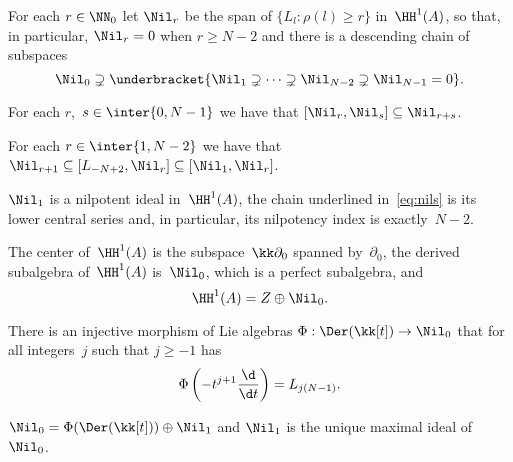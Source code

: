 \begin{Proposition}\label{prop:nil}
For each $r\in\NN_0$ let $\Nil_r$ be the span of $\{L_l:\rho(l)\geq r\}$
in~$\HH^1(A)$, so that, in particular, $\Nil_r=0$ when $r\geq N-2$ and
there is a descending chain of subspaces
  \[ \label{eq:nils}
        \Nil_0 \supsetneq 
          \underbracket{
              \Nil_1
              \supsetneq \cdots
              \supsetneq \Nil_{N-2}
              \supsetneq \Nil_{N-1} = 0
              }
        .
  \]
\begin{thmlist}

\item For each $r$,~$s\in\inter{0,N-1}$ we have that
$[\Nil_r,\Nil_s]\subseteq\Nil_{r+s}$.

\item For each $r\in\inter{1,N-2}$ we have that
$\Nil_{r+1}\subseteq[L_{-N+2},\Nil_r]\subseteq[\Nil_1,\Nil_r]$.

\item $\Nil_1$ is a nilpotent ideal in~$\HH^1(A)$, the chain underlined
in~\eqref{eq:nils} is its lower central series and, in particular, its
nilpotency index is exactly~$N-2$.

\item The center of~$\HH^1(A)$ is the subspace~$\kk\partial_0$ spanned
by~$\partial_0$, the derived subalgebra of~$\HH^1(A)$ is~$\Nil_0$, which is
a perfect subalgebra, and 
  \[
  \HH^1(A) = Z \oplus \Nil_0.
  \]

\item There is an injective morphism of Lie algebras
$\Phi:\Der(\kk[t])\to\Nil_0$ that for all integers~$j$ such that $j\geq-1$
has
  \[
  \Phi\left(-t^{j+1}\frac{\d}{\d t}\right) = L_{j(N-1)}.
  \]

\item $\Nil_0=\Phi(\Der(\kk[t]))\oplus\Nil_1$ and $\Nil_1$ is the unique
maximal ideal of~$\Nil_0$.

\end{thmlist}
\end{Proposition}


